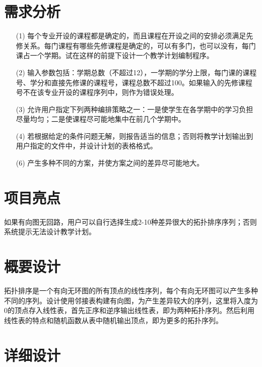 \documentclass{DateStructure}
\begin{document}
\makecover
\newpage
\thispagestyle{empty}
\tableofcontents   
\newpage
\setcounter{page}{1}  

\section{需求分析}
\begin{itemize}
\item[(1)]每个专业开设的课程都是确定的，而且课程在开设之间的安排必须满足先修关系。每门课程有哪些先修课程是确定的，可以有多门，也可以没有，每门课占一个学期。试在这样的前提下设计一个教学计划编制程序。
\item[(2)]输入参数包括：学期总数（不超过12），一学期的学分上限，每门课的课程号、学分和直接先修课的课程号，课程总数不超过100。如果输入的先修课程号不在该专业开设的课程序列中，则作为错误处理。
\item[(3)]允许用户指定下列两种编排策略之一：一是使学生在各学期中的学习负担尽量均匀；二是使课程尽可能地集中在前几个学期中。
\item[(4)]若根据给定的条件问题无解，则报告适当的信息；否则将教学计划输出到用户指定的文件中，并设计计划的表格格式。
\item[(6)]产生多种不同的方案，并使方案之间的差异尽可能地大。
\end{itemize}

\section{项目亮点}
如果有向图无回路，用户可以自行选择生成2-10种差异很大的拓扑排序序列；否则系统提示无法设计教学计划。
\section{概要设计}
拓扑排序是一个有向无环图的所有顶点的线性序列，每个有向无环图可以产生多种不同的序列。设计使用邻接表构建有向图，为产生差异较大的序列，这里将入度为0的顶点存入线性表，首先正序和逆序输出线性表，即为两种拓扑序列。然后利用线性表的特点和随机函数从表中随机输出顶点，即为更多的拓扑序列。

\section{详细设计}
\end{document}
